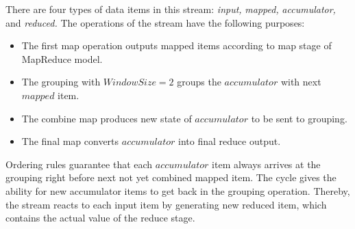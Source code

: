 There are four types of data items in this stream: {\em input,} {\em mapped,} {\em accumulator,} and {\em reduced.} 
The operations of the stream have the following purposes:

\begin{itemize}
  \item The first map operation outputs mapped items according to map stage of MapReduce model.
  
  \item The grouping with $WindowSize=2$ groups the $accumulator$  with next $mapped$  item. 
  
  \item The combine map  produces new state of $accumulator$ to be sent  to grouping.
  
  \item The final map converts $accumulator$ into final reduce output.
\end{itemize}

Ordering rules  guarantee that each $accumulator$  item always arrives at the grouping right before next not yet combined mapped item.
The cycle gives the ability for new accumulator items to get back in the grouping operation. 
Thereby, the stream reacts to each input item by generating new reduced item, which contains the actual value of the reduce stage.



